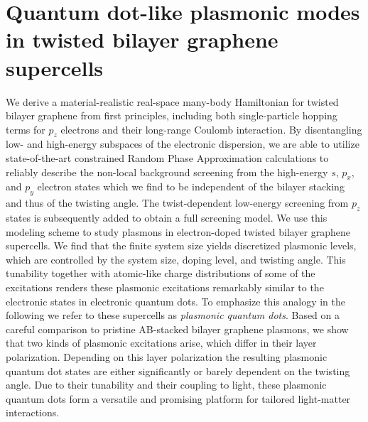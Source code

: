 \openleft%
\chapter[\MultilineTitle{Quantum dot-like plasmonic modes in twisted bilayer graphene supercells}][Quantum dot-like plasmonic modes in twisted bilayer graphene supercells]{Quantum dot-like plasmonic modes in twisted bilayer graphene supercells}\label{ch:mat22}


{\small We derive a material-realistic real-space many-body Hamiltonian for twisted bilayer graphene from first principles, including both single-particle hopping terms for $p_z$ electrons and their long-range Coulomb interaction. By disentangling low- and high-energy subspaces of the electronic dispersion, we are able to utilize state-of-the-art constrained Random Phase Approximation calculations to reliably describe the non-local background screening from the high-energy $s$, $p_x$, and $p_y$ electron states which we find to be independent of the bilayer stacking and thus of the twisting angle. The twist-dependent low-energy screening from $p_z$ states is subsequently added to obtain a full screening model.  We use this modeling scheme to study plasmons in electron-doped twisted bilayer graphene supercells. We find that the finite system size yields discretized plasmonic levels, which are controlled by the system size, doping level, and twisting angle. This tunability together with atomic-like charge distributions of some of the excitations renders these plasmonic excitations remarkably similar to the electronic states in electronic quantum dots. To emphasize this analogy in the following we refer to these supercells as \emph{plasmonic quantum dots}.  Based on a careful comparison to pristine AB-stacked bilayer graphene plasmons, we show that two kinds of plasmonic excitations arise, which differ in their layer polarization. Depending on this layer polarization the resulting plasmonic quantum dot states are either significantly or barely dependent on the twisting angle. Due to their tunability and their coupling to light, these plasmonic quantum dots form a versatile and promising platform for tailored light-matter interactions.}

\clearpage


